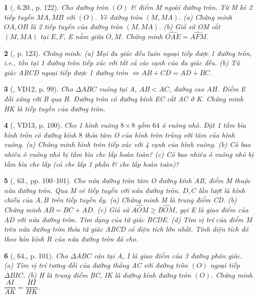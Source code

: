 \documentclass{article}
\newtheorem{baitoan}{}
\begin{document}
\begin{baitoan}[\cite{Binh_boi_duong_Toan_9_tap_1}, 6.20., p. 122]
	Cho đường tròn $(O)$ \& điểm M ngoài đường tròn. Từ M kẻ 2 tiếp tuyến $MA,MB$ với $(O)$. Vẽ đường tròn $(M,MA)$. (a) Chứng minh $OA,OB$ là 2 tiếp tuyến của đường tròn $(M,MA)$. (b) Giả sử OM cắt $(M,MA)$ tại $E,F$, E nằm giữa $O,M$. Chứng minh $\widehat{OAE} = \widehat{AFM}$.
\end{baitoan}

\begin{baitoan}[\cite{Binh_boi_duong_Toan_9_tap_1}, p. 123]
	Chứng minh: (a) Mọi đa giác đều luôn ngoại tiếp được 1 đường tròn, i.e., tồn tại 1 đường tròn tiếp xúc với tất cả các cạnh của đa giác đều. (b) Tứ giác ABCD ngoại tiếp được 1 đường tròn $\Leftrightarrow AB + CD = AD + BC$.
\end{baitoan}

\begin{baitoan}[\cite{Binh_Toan_9_tap_1}, VD12, p. 99]
	Cho $\Delta ABC$ vuông tại A, $AB < AC$, đường cao $AH$. Điểm E đối xứng với B qua H. Đường tròn có đường kính EC cắt AC ở K. Chứng minh HK là tiếp tuyến của đường tròn.
\end{baitoan}

\begin{baitoan}[\cite{Binh_Toan_9_tap_1}, VD13, p. 100]
	Cho 1 hình vuông $8\times8$ gồm $64$ ô vuông nhỏ. Đặt 1 tấm bìa hình tròn có đường kính $8$ thỏa tâm O của hình tròn trùng với tâm của hình vuông. (a) Chứng minh hình tròn tiếp xúc với 4 cạnh của hình vuông. (b) Có bao nhiêu ô vuông nhỏ bị tấm bìa che lấp hoàn toàn? (c) Có bao nhiêu ô vuông nhỏ bị tấm bìa che lấp (cả che lấp 1 phần \& che lấp hoàn toàn)?
\end{baitoan}

\begin{baitoan}[\cite{Binh_Toan_9_tap_1}, 63., pp. 100--101]
	Cho nửa đường tròn tâm O đường kính AB, điểm M thuộc nửa đường tròn. Qua M vẽ tiếp tuyến với nửa đường tròn. $D,C$ lần lượt là hình chiếu của $A,B$ trên tiếp tuyến ấy. (a) Chứng minh M là trung điểm CD. (b) Chứng minh $AB = BC + AD$. (c) Giả sử $ \widehat{AOM}\ge\widehat{BOM}$, gọi E là giao điểm của AD với nửa đường tròn. Tìm dạng của tứ giác BCDE. (d) Tìm vị trí của điểm M trên nửa đường tròn thỏa tứ giác ABCD có diện tích lớn nhất. Tính diện tích đó theo bán kính $R$ của nửa đường tròn đã cho.
\end{baitoan}

\begin{baitoan}[\cite{Binh_Toan_9_tap_1}, 64., p. 101]
	Cho $\Delta ABC$ cân tại A, I là giao điểm của 3 đường phân giác. (a) Tìm vị trí tương đối của đường thẳng AC với đường tròn $(O)$ ngoại tiếp $\Delta BIC$. (b) H là trung điểm BC, IK là đường kính đường tròn $(O)$. Chứng minh $\dfrac{AI}{AK} = \dfrac{HI}{HK}$.
\end{baitoan}
\end{document}
